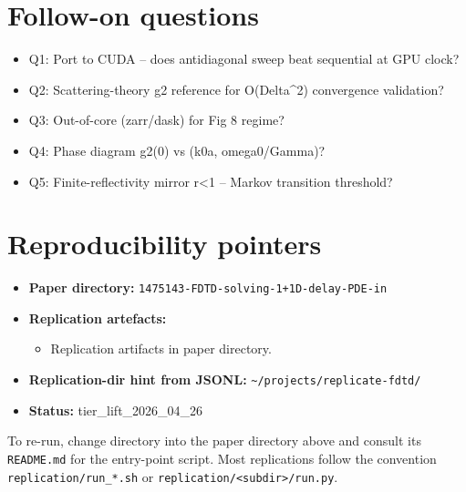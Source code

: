 \documentclass[11pt]{article}
\begin{document}
\section{Follow-on questions}
\begin{itemize}
\item Q1: Port to CUDA -- does antidiagonal sweep beat sequential at GPU clock?
\item Q2: Scattering-theory g2 reference for O(Delta\textasciicircum{}2) convergence validation?
\item Q3: Out-of-core (zarr/dask) for Fig 8 regime?
\item Q4: Phase diagram g2(0) vs (k0a, omega0/Gamma)?
\item Q5: Finite-reflectivity mirror r\textless{}1 -- Markov transition threshold?
\end{itemize}

\section{Reproducibility pointers}\label{sec:repro}
\begin{itemize}
\item \textbf{Paper directory:} \texttt{1475143-FDTD-solving-1+1D-delay-PDE-in}
\item \textbf{Replication artefacts:}
\begin{itemize}
\item Replication artifacts in paper directory.
\end{itemize}
\item \textbf{Replication-dir hint from JSONL:} \texttt{\textasciitilde{}/projects/replicate-fdtd/}
\item \textbf{Status:} tier\_lift\_2026\_04\_26
\end{itemize}

To re-run, change directory into the paper directory above and consult its \texttt{README.md} for the entry-point script. Most replications follow the convention \texttt{replication/run\_*.sh} or \texttt{replication/<subdir>/run.py}.
\end{document}
